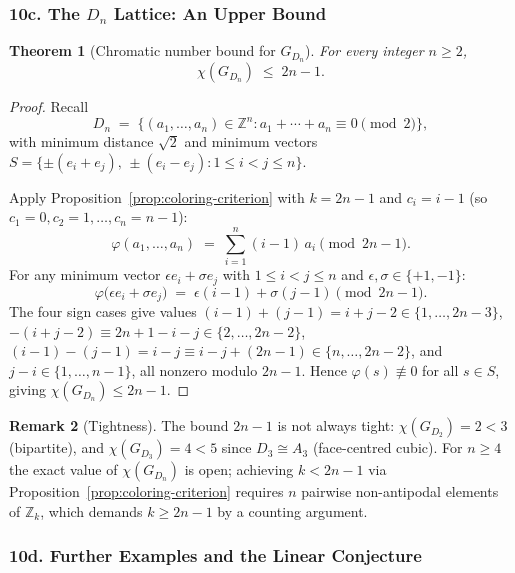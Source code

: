\documentclass{article}
\newtheorem{theorem}{Theorem}[section]
\theoremstyle{definition}
\newtheorem{remark}[theorem]{Remark}
\begin{document}
\subsubsection*{10c. The $D_n$ Lattice: An Upper Bound}

\begin{theorem}[Chromatic number bound for $G_{D_n}$]\label{thm:Dn-coloring}
For every integer $n \ge 2$,
\[
  \chi(G_{D_n}) \;\le\; 2n - 1.
\]
\end{theorem}

\begin{proof}
Recall
\[
  D_n \;=\; \bigl\{(a_1, \ldots, a_n) \in \mathbb{Z}^n : a_1 + \cdots + a_n \equiv 0 \pmod{2}\bigr\},
\]
with minimum distance $\sqrt{2}$ and minimum vectors $S = \{\pm(e_i + e_j),\, \pm(e_i - e_j) : 1 \le i < j \le n\}$.

Apply Proposition~\ref{prop:coloring-criterion} with $k = 2n-1$ and $c_i = i-1$ (so $c_1=0, c_2=1, \ldots, c_n=n-1$):
\[
  \varphi(a_1, \ldots, a_n) \;=\; \sum_{i=1}^n (i-1)\,a_i \pmod{2n-1}.
\]
For any minimum vector $\epsilon e_i + \sigma e_j$ with $1 \le i < j \le n$ and $\epsilon, \sigma \in \{+1,-1\}$:
\[
  \varphi\bigl(\epsilon e_i + \sigma e_j\bigr) \;=\; \epsilon(i-1) + \sigma(j-1) \pmod{2n-1}.
\]
The four sign cases give values $(i-1)+(j-1) = i+j-2 \in \{1,\ldots,2n-3\}$, $-(i+j-2) \equiv 2n+1-i-j \in \{2,\ldots,2n-2\}$, $(i-1)-(j-1)=i-j \equiv i-j+(2n-1) \in \{n,\ldots,2n-2\}$, and $j-i \in \{1,\ldots,n-1\}$, all nonzero modulo $2n-1$.  Hence $\varphi(s) \not\equiv 0$ for all $s \in S$, giving $\chi(G_{D_n}) \le 2n-1$.
\end{proof}

\begin{remark}[Tightness]
The bound $2n-1$ is not always tight: $\chi(G_{D_2}) = 2 < 3$ (bipartite), and $\chi(G_{D_3}) = 4 < 5$ since $D_3 \cong A_3$ (face-centred cubic).  For $n \ge 4$ the exact value of $\chi(G_{D_n})$ is open; achieving $k < 2n-1$ via Proposition~\ref{prop:coloring-criterion} requires $n$ pairwise non-antipodal elements of $\mathbb{Z}_k$, which demands $k \ge 2n-1$ by a counting argument.
\end{remark}

\subsubsection*{10d. Further Examples and the Linear Conjecture}
\end{document}

